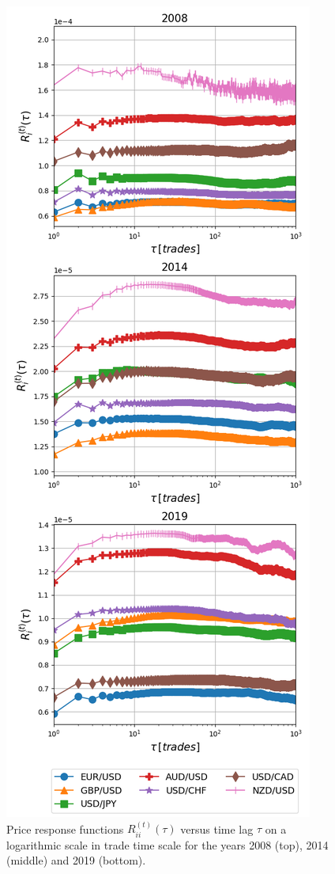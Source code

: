 \begin{figure}[htbp]
    \centering
    \includegraphics[width=\columnwidth]
    {figures/04_responses_trade_scale.png}
    \caption{Price response functions
             $R^{\left(t\right)}_{ii}\left(\tau\right)$ versus time lag $\tau$
             on a logarithmic scale in trade time scale for the years 2008
             (top), 2014 (middle) and 2019 (bottom).}
    \label{fig:response_function_trade_scale}
\end{figure}

